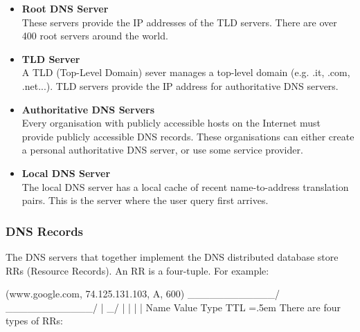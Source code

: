 \documentclass{article}
\newenvironment{lcverbatim}
 {\SaveVerbatim{cverb}}
 {\endSaveVerbatim
  \flushleft\fboxrule=0pt\fboxsep=.5em
  \colorbox{cverbbg}{%
    \makebox[\dimexpr\linewidth-2\fboxsep][l]{\BUseVerbatim{cverb}}%
  }
  \endflushleft
}
\begin{document}
\begin{itemize}
	\item \textbf{Root DNS Server}
	\vspace{.2cm} \\
	These servers provide the IP addresses of the TLD servers. There are over 400 root servers around the world.
	\item \textbf{TLD Server}
	\vspace{.2cm} \\
	A TLD (Top-Level Domain) sever manages a top-level domain (e.g. .it, .com, .net...). TLD servers provide the IP address for authoritative DNS servers.
	\item \textbf{Authoritative DNS Servers}
	\vspace{.2cm} \\
	Every organisation with publicly accessible hosts on the Internet must provide publicly accessible DNS records. These organisations can either create a personal authoritative DNS server, or use some service provider.
	\item \textbf{Local DNS Server}
	\vspace{.2cm} \\
	The local DNS server has a local cache of recent name-to-address translation pairs. This is the server where the user query first arrives.
\end{itemize}

\subsubsection{DNS Records}
The DNS servers that together implement the DNS distributed database store RRs (Resource Records). An RR is a four-tuple. For example:

\begin{lcverbatim}
(www.google.com, 74.125.131.103, A, 600)	
 \____________/  \____________/  |  \_/
        |               |        |   |
       Name           Value    Type  TTL
\end{lcverbatim}
There are four types of RRs:
\end{document}
